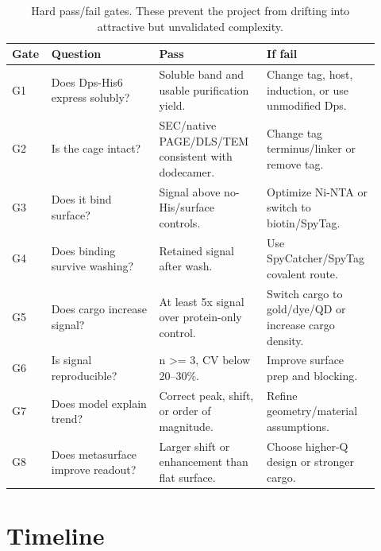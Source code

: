 \documentclass[11pt]{article}
\begin{document}
\begin{table}[H]
\centering
\small
\begin{tabular}{p{0.08\linewidth}p{0.28\linewidth}p{0.29\linewidth}p{0.27\linewidth}}
\toprule
Gate & Question & Pass & If fail \\
\midrule
G1 & Does Dps-His6 express solubly? & Soluble band and usable purification yield. & Change tag, host, induction, or use unmodified Dps. \\
G2 & Is the cage intact? & SEC/native PAGE/DLS/TEM consistent with dodecamer. & Change tag terminus/linker or remove tag. \\
G3 & Does it bind surface? & Signal above no-His/surface controls. & Optimize Ni-NTA or switch to biotin/SpyTag. \\
G4 & Does binding survive washing? & Retained signal after wash. & Use SpyCatcher/SpyTag covalent route. \\
G5 & Does cargo increase signal? & At least 5x signal over protein-only control. & Switch cargo to gold/dye/QD or increase cargo density. \\
G6 & Is signal reproducible? & n >= 3, CV below 20--30\%. & Improve surface prep and blocking. \\
G7 & Does model explain trend? & Correct peak, shift, or order of magnitude. & Refine geometry/material assumptions. \\
G8 & Does metasurface improve readout? & Larger shift or enhancement than flat surface. & Choose higher-Q design or stronger cargo. \\
\bottomrule
\end{tabular}
\caption{Hard pass/fail gates. These prevent the project from drifting into attractive but unvalidated complexity.}
\label{tab:gates}
\end{table}

\section{Timeline}
\end{document}
